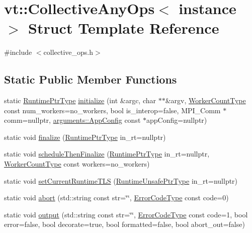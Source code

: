 \hypertarget{structvt_1_1_collective_any_ops}{}\section{vt\+:\+:Collective\+Any\+Ops$<$ instance $>$ Struct Template Reference}
\label{structvt_1_1_collective_any_ops}


{\ttfamily \#include $<$collective\+\_\+ops.\+h$>$}

\subsection*{Static Public Member Functions}
\begin{DoxyCompactItemize}
\item 
static \hyperlink{namespacevt_a0ce60e0299d8fa32223b3b9ffa0af466}{Runtime\+Ptr\+Type} \hyperlink{structvt_1_1_collective_any_ops_ae0b57c10a49875db49abc536a2a5c19c}{initialize} (int \&argc, char $\ast$$\ast$\&argv, \hyperlink{namespacevt_aa93398ea48f2cb6c188512250f7cc248}{Worker\+Count\+Type} const num\+\_\+workers=no\+\_\+workers, bool is\+\_\+interop=false, M\+P\+I\+\_\+\+Comm $\ast$comm=nullptr, \hyperlink{structvt_1_1arguments_1_1_app_config}{arguments\+::\+App\+Config} const $\ast$app\+Config=nullptr)
\item 
static void \hyperlink{structvt_1_1_collective_any_ops_ae2260154e455458fc26f02f0bce6702d}{finalize} (\hyperlink{namespacevt_a0ce60e0299d8fa32223b3b9ffa0af466}{Runtime\+Ptr\+Type} in\+\_\+rt=nullptr)
\item 
static void \hyperlink{structvt_1_1_collective_any_ops_a10be760566e5c50ce6d35ab93d7736ce}{schedule\+Then\+Finalize} (\hyperlink{namespacevt_a0ce60e0299d8fa32223b3b9ffa0af466}{Runtime\+Ptr\+Type} in\+\_\+rt=nullptr, \hyperlink{namespacevt_aa93398ea48f2cb6c188512250f7cc248}{Worker\+Count\+Type} const workers=no\+\_\+workers)
\item 
static void \hyperlink{structvt_1_1_collective_any_ops_aa86dfdc9c8ac6f25033948b5dd26fb5b}{set\+Current\+Runtime\+T\+LS} (\hyperlink{namespacevt_a8019b70cc4b9b0833c38559c85dfd53b}{Runtime\+Unsafe\+Ptr\+Type} in\+\_\+rt=nullptr)
\item 
static void \hyperlink{structvt_1_1_collective_any_ops_a31a089ab739c612171e581ead8922e8b}{abort} (std\+::string const str=\char`\"{}\char`\"{}, \hyperlink{namespacevt_a793764d753923abc3d32929870beb485}{Error\+Code\+Type} const code=0)
\item 
static void \hyperlink{structvt_1_1_collective_any_ops_a5ae4676659166ab1e1ac7334776d58c3}{output} (std\+::string const str=\char`\"{}\char`\"{}, \hyperlink{namespacevt_a793764d753923abc3d32929870beb485}{Error\+Code\+Type} const code=1, bool error=false, bool decorate=true, bool formatted=false, bool abort\+\_\+out=false)
\end{DoxyCompactItemize}


